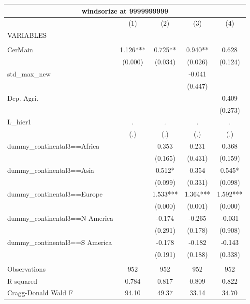 \begin{tabular}{lcccc}
\multicolumn{5}{c}{windsorize at 9999999999} \\ \hline
 & (1) & (2) & (3) & (4) \\
VARIABLES &  &  &  &  \\ \hline
 &  &  &  &  \\
CerMain & 1.126*** & 0.725** & 0.940** & 0.628 \\
 & (0.000) & (0.034) & (0.026) & (0.124) \\
std\_max\_new &  &  & -0.041 &  \\
 &  &  & (0.447) &  \\
Dep. Agri. &  &  &  & 0.409 \\
 &  &  &  & (0.273) \\
L\_hier1 & . & . & . & . \\
 & (.) & (.) & (.) & (.) \\
dummy\_continental3==Africa &  & 0.353 & 0.231 & 0.368 \\
 &  & (0.165) & (0.431) & (0.159) \\
dummy\_continental3==Asia &  & 0.512* & 0.354 & 0.545* \\
 &  & (0.099) & (0.331) & (0.098) \\
dummy\_continental3==Europe &  & 1.533*** & 1.364*** & 1.592*** \\
 &  & (0.000) & (0.001) & (0.000) \\
dummy\_continental3==N America &  & -0.174 & -0.265 & -0.031 \\
 &  & (0.291) & (0.178) & (0.908) \\
dummy\_continental3==S America &  & -0.178 & -0.182 & -0.143 \\
 &  & (0.191) & (0.188) & (0.338) \\
 &  &  &  &  \\
Observations & 952 & 952 & 952 & 952 \\
R-squared & 0.784 & 0.817 & 0.809 & 0.822 \\
 Cragg-Donald Wald F & 94.10 & 49.37 & 33.14 & 34.70 \\ \hline
\end{tabular}
